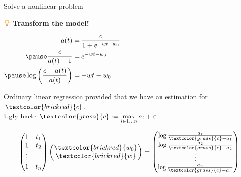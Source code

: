 \documentclass[UKenglish,aspectratio=169]{beamer}
\newcommand\unknown[1]{\textcolor{brickred}{#1}}
\newcommand\known[1]{\textcolor{grass}{#1}}
\begin{document}
\begin{frame}{Solve a nonlinear problem}
\begin{minipage}{.35\linewidth}
\includegraphics[width=10pt]{../manuscript/img/idea.png} \textbf{Transform the model!}

\vspace{1ex}
$\begin{aligned}
a(t) &= \frac{c}{1+e^{-wt - w_0}} \\ \pause
\frac{c}{a(t)-1} & = e^{-wt-w_0}  \\ \pause
\log\left(\frac{c-a(t)}{a(t)}\right) & = -wt-w_0
\end{aligned}
$
\end{minipage}
\quad
\begin{minipage}{.6\linewidth}
\end{minipage}

\pause
\vspace{1ex}
Ordinary linear regression provided that we have an estimation for $\unknown{c}$.\\
Ugly hack: $\known{c}:=\max\limits_{i\in 1\dots n} a_i + \varepsilon$

\pause
$$
\begin{pmatrix}
1 & t_1 \\
1 & t_2 \\
\vdots & \\
1 & t_n
\end{pmatrix}
\begin{pmatrix}
\unknown{w_0}\\
\unknown{w}
\end{pmatrix}
=
\begin{pmatrix}
\log\frac{a_1}{\known{c} - a_1}\\
\log\frac{a_2}{\known{c} - a_2}\\
\vdots \\
\log\frac{a_n}{\known{c} - a_n}
\end{pmatrix}
$$
\pause
\end{frame}
\end{document}
